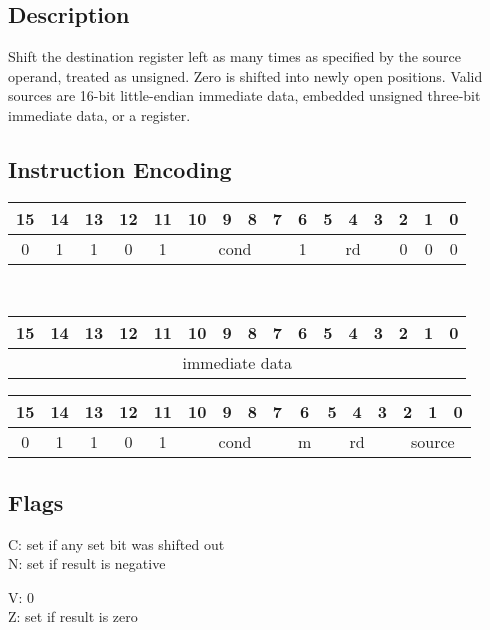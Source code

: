 \documentclass[11pt]{book}
\newcommand*{\encoding}[1]{\noindent
\begin{tabular}{|c|c|c|c|c|c|c|c|c|c|c|c|c|c|c|c|}
\multicolumn{1}{c}{15}&
\multicolumn{1}{c}{14}&
\multicolumn{1}{c}{13}&
\multicolumn{1}{c}{12}&
\multicolumn{1}{c}{11}&
\multicolumn{1}{c}{10}&
\multicolumn{1}{c}{9}&
\multicolumn{1}{c}{8}&
\multicolumn{1}{c}{7}&
\multicolumn{1}{c}{6}&
\multicolumn{1}{c}{5}&
\multicolumn{1}{c}{4}&
\multicolumn{1}{c}{3}&
\multicolumn{1}{c}{2}&
\multicolumn{1}{c}{1}&
\multicolumn{1}{c}{0}\\\hline
#1\\\hline
\end{tabular}}
\begin{document}
\subsection*{Description}
Shift the destination register left as many times
as specified by the source operand, treated as unsigned.
Zero is shifted into newly open positions.
Valid sources are 16-bit little-endian immediate data,
embedded unsigned three-bit immediate data,
or a register.

\subsection*{Instruction Encoding}
\encoding{0&1&1&0&1%
&\multicolumn{4}{|c|}{cond}%
&1&\multicolumn{3}{|c|}{rd}&0&0&0}\\\null\qquad
\encoding{\multicolumn{16}{|c|}{immediate data}}

\vspace{2\baselineskip}
\encoding{0&1&1&0&1%
&\multicolumn{4}{|c|}{cond}%
&m&\multicolumn{3}{|c|}{rd}&\multicolumn{3}{|c|}{source}}

\subsection*{Flags}
\begin{multicols}{2}\noindent
  C: set if any set bit was shifted out\\
  N: set if result is negative

  \columnbreak\noindent
  V: 0\\
  Z: set if result is zero
\end{multicols}
\end{document}
